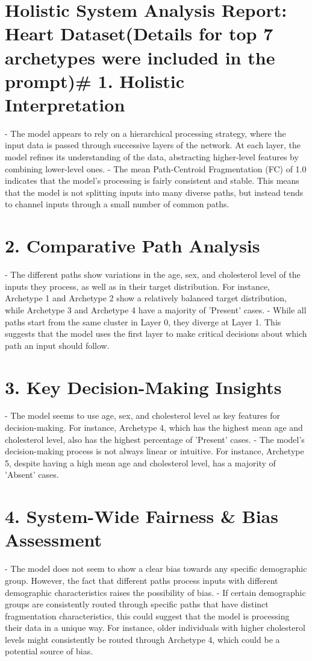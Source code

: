 \section*{Holistic System Analysis Report: Heart Dataset\n(Details for top 7 archetypes were included in the prompt)\n\n# 1. Holistic Interpretation}
- The model appears to rely on a hierarchical processing strategy, where the input data is passed through successive layers of the network. At each layer, the model refines its understanding of the data, abstracting higher-level features by combining lower-level ones.
- The mean Path-Centroid Fragmentation (FC) of 1.0 indicates that the model's processing is fairly consistent and stable. This means that the model is not splitting inputs into many diverse paths, but instead tends to channel inputs through a small number of common paths.

\section*{2. Comparative Path Analysis}
- The different paths show variations in the age, sex, and cholesterol level of the inputs they process, as well as in their target distribution. For instance, Archetype 1 and Archetype 2 show a relatively balanced target distribution, while Archetype 3 and Archetype 4 have a majority of 'Present' cases.
- While all paths start from the same cluster in Layer 0, they diverge at Layer 1. This suggests that the model uses the first layer to make critical decisions about which path an input should follow.

\section*{3. Key Decision-Making Insights}
- The model seems to use age, sex, and cholesterol level as key features for decision-making. For instance, Archetype 4, which has the highest mean age and cholesterol level, also has the highest percentage of 'Present' cases.
- The model's decision-making process is not always linear or intuitive. For instance, Archetype 5, despite having a high mean age and cholesterol level, has a majority of 'Absent' cases.

\section*{4. System-Wide Fairness \& Bias Assessment}
- The model does not seem to show a clear bias towards any specific demographic group. However, the fact that different paths process inputs with different demographic characteristics raises the possibility of bias.
- If certain demographic groups are consistently routed through specific paths that have distinct fragmentation characteristics, this could suggest that the model is processing their data in a unique way. For instance, older individuals with higher cholesterol levels might consistently be routed through Archetype 4, which could be a potential source of bias.

